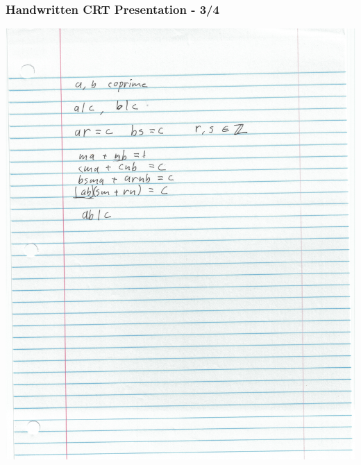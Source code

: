 \documentclass[aspectratio=169]{beamer}
\begin{document}
\begin{frame}[fragile]
\frametitle{Handwritten CRT Presentation - 3/4}
\includegraphics[height=0.8\paperheight]{jacques_page3.jpg}
\end{frame}
\end{document}
